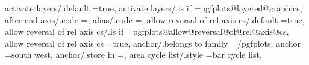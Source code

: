 activate layers/.default                                           =true,                                                                                                                              
activate layers/.is if                                             =pgfplots@layered@graphics,                                                                                                         
after end axis/.code                                               =,                                                                                                                                  
alias/.code                                                        ={},                                                   
allow reversal of rel axis cs/.default                             =true,%
allow reversal of rel axis cs/.is if                               =pgfplots@allow@reversal@of@rel@axis@cs,%
allow reversal of rel axis cs                                      =true,%
anchor/.belongs to family                                          =/pgfplots,                                                                                                                         
anchor                                                             =south west,                                                                                                                        
anchor/.store in                                                   =\pgfplots@anchorname,                                                                                                              
area cycle list/.style                                             ={bar cycle list},                                                                                                                  
